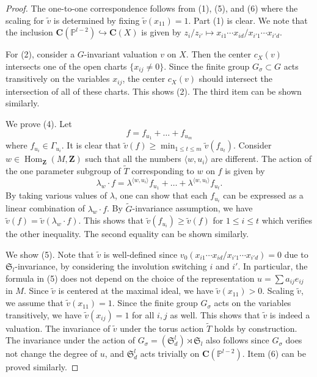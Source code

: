 \documentclass[letterpaper,11pt]{amsart}
\theoremstyle{plain}
\theoremstyle{definition}
\theoremstyle{remark}
\newcommand{\PP}{\mathbb{P}}
\newcommand{\CC}{\mathbf{C}}
\newcommand{\ZZ}{\mathbf{Z}}
\DeclareMathOperator{\Hom}{Hom}
\begin{document}
    \begin{proof}
        The one-to-one correspondence follows from (1), (5), and (6) where the scaling for $\widetilde{v}$ is determined by fixing $\widetilde{v}(x_{11}) = 1$. Part (1) is clear. We note that the inclusion $\CC(\PP^{l-2}) \hookrightarrow \CC(X)$ is given by $z_{i}/z_{i'} \mapsto x_{i1}\cdots x_{id}/x_{i'1}\cdots x_{i'd}$.
        
        For (2), consider a $G$-invariant valuation $v$ on $X$. Then the center $c_{X}(v)$ intersects one of the open charts $\{ x_{ij} \neq 0\}$. Since the finite group $G_{\sigma} \subset G$ acts transitively on the variables $x_{ij}$, the center $c_{X}(v)$ should intersect the intersection of all of these charts. This shows (2). The third item can be shown similarly.
        
        We prove (4). Let
        $$ f = f_{u_{1}} + \ldots + f_{u_{m}}$$
        where $f_{u_{i}} \in \Gamma_{u_{i}}$. It is clear that $\widetilde{v}(f) \geq \min_{1 \leq t \leq m} \widetilde{v}(f_{u_{t}})$. Consider $w \in \Hom_{\ZZ}(M, \ZZ)$ such that all the numbers $\langle w , u_{i}\rangle$ are different. The action of the one parameter subgroup of $\widetilde{T}$ corresponding to $w$ on $f$ is given by
        $$ \lambda_{w} \cdot f = \lambda^{\langle w , u_{i} \rangle} f_{u_{1}} + \ldots + \lambda^{\langle w, u_{t} \rangle} f_{u_{t}}.$$
        By taking various values of $\lambda$, one can show that each $f_{u_{i}}$ can be expressed as a linear combination of $\lambda_{w} \cdot f$. By $\widetilde{G}$-invariance assumption, we have $\widetilde{v}(f) = \widetilde{v}(\lambda_{w} \cdot f)$. This shows that $\widetilde{v}(f_{u_{i}}) \geq \widetilde{v}(f)$ for $1 \leq i \leq t$ which verifies the other inequality. The second equality can be shown similarly.
        
        We show (5). Note that $\widetilde{v}$ is well-defined since $v_{0}(x_{i1}\cdots x_{id}/x_{i'1}\cdots x_{i'd}) = 0$ due to $\mathfrak{S}_{l}$-invariance, by considering the involution switching $i$ and $i'$. In particular, the formula in (5) does not depend on the choice of the representation $u = \sum a_{ij} e_{ij}$ in $M$. Since $\widetilde{v}$ is centered at the maximal ideal, we have $\widetilde{v}(x_{11}) > 0$. Scaling $\widetilde{v}$, we assume that $\widetilde{v}(x_{11}) = 1$. Since the finite group $G_{\sigma}$ acts on the variables transitively, we have $\widetilde{v}(x_{ij}) = 1$ for all $i,j$ as well. This shows that $\widetilde{v}$ is indeed a valuation. The invariance of $\widetilde{v}$ under the torus action $\widetilde{T}$ holds by construction. The invariance under the action of $G_{\sigma} = (\mathfrak{S}_{d}^{l}) \rtimes \mathfrak{S}_{l}$ also follows since $G_{\sigma}$ does not change the degree of $u$, and $\mathfrak{S}_{d}^{l}$ acts trivially on $\CC(\PP^{l-2})$. Item (6) can be proved similarly.
        

\end{proof}
\end{document}
